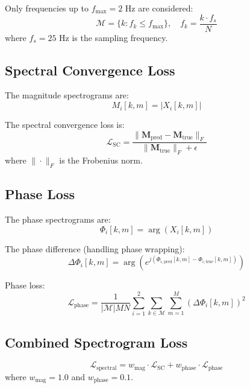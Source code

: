 \documentclass{article}
\begin{document}
Only frequencies up to $f_{\max} = 2$ Hz are considered:
\begin{equation}
\mathcal{M} = \{k : f_k \leq f_{\max}\}, \quad f_k = \frac{k \cdot f_s}{N}
\end{equation}
where $f_s = 25$ Hz is the sampling frequency.

\subsection{Spectral Convergence Loss}

The magnitude spectrograms are:
\begin{equation}
M_i[k, m] = |X_i[k, m]|
\end{equation}

The spectral convergence loss is:
\begin{equation}
\mathcal{L}_{\text{SC}} = \frac{\|\bm{M}_{\text{pred}} - \bm{M}_{\text{true}}\|_F}{\|\bm{M}_{\text{true}}\|_F + \epsilon}
\end{equation}
where $\|\cdot\|_F$ is the Frobenius norm.

\subsection{Phase Loss}

The phase spectrograms are:
\begin{equation}
\Phi_i[k, m] = \arg(X_i[k, m])
\end{equation}

The phase difference (handling phase wrapping):
\begin{equation}
\Delta\Phi_i[k, m] = \arg\left(e^{j(\Phi_{i,\text{pred}}[k,m] - \Phi_{i,\text{true}}[k,m])}\right)
\end{equation}

Phase loss:
\begin{equation}
\mathcal{L}_{\text{phase}} = \frac{1}{|\mathcal{M}|MN} \sum_{i=1}^{2} \sum_{k \in \mathcal{M}} \sum_{m=1}^{M} (\Delta\Phi_i[k, m])^2
\end{equation}

\subsection{Combined Spectrogram Loss}

\begin{equation}
\mathcal{L}_{\text{spectral}} = w_{\text{mag}} \cdot \mathcal{L}_{\text{SC}} + w_{\text{phase}} \cdot \mathcal{L}_{\text{phase}}
\end{equation}
where $w_{\text{mag}} = 1.0$ and $w_{\text{phase}} = 0.1$.
\end{document}
